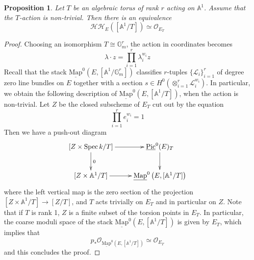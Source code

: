 \documentclass[11pt,letterpaper]{amsart}
\newtheorem{proposition}[dummy]{Proposition}
\newcommand{\bA}{\mathbb{A}}
\newcommand{\bG}{\mathbb{G}}
\newcommand{\cO}{\mathcal{O}}
\newcommand{\cL}{\mathcal{L}}
\newcommand{\cHH}{\mathcal{HH}}
\newcommand{\Mapo}[2]{\underline{\mathrm{Map}}^{0}\left (#1,#2\right )}
\newcommand{\Spec}{\mathrm{S}\mathrm{pec}\,}
\newcommand{\Pic}{\underline{\mathrm{Pic}}}
\begin{document}
\begin{proposition}\label{proposition:toricopen1}
Let $T$ be an algebraic torus of rank $r$ acting on $\bA^1$. Assume that the $T$-action is non-trivial. 
 Then there is an equivalence 
\begin{equation*}
    \cHH_E([\bA^1/T]) \simeq \cO_{E_T}
\end{equation*}
\end{proposition}
\begin{proof}
Choosing an isomorphism $T\cong \bG_m^r$, the action in coordinates becomes
$$\lambda\cdot z=\prod_{i=1}^{r}\lambda_i^{w_i}z$$
Recall that the stack $\Mapo{E}{[\bA^1/\bG_m^r]}$ classifies $r$-tuples $\{\cL_i\}_{i=1}^{r}$ of degree zero line bundles on $E$ together with a section $s\in H^0(\otimes_{i=1}^{r} \cL_i^{w_i})$. In particular, we obtain the following description of $\Mapo{E}{[\bA^1/T]}$, when the action is non-trivial. Let $Z$ be the closed subscheme of $E_T$ cut out by the equation
\begin{equation}\label{eq:e}
\prod_{i=1}^{r} e_i^{w_i}=1
\end{equation}
Then we have a push-out diagram
$$
\xymatrix{
[Z\times\Spec k/T]\ar[d]^{0}\ar[r] & \Pic^0(E)_T\ar[d]\\
[Z\times\bA^1/T]\ar[r] & \Mapo{E}{[\bA^1/T]}\\
}
$$
where the left vertical map is the zero section of the projection $[Z\times\bA^1/T]\to[Z/T]$, and $T$ acts trivially on $E_T$ and in particular on $Z$. Note that if $T$ is rank 1,  $Z$ is a finite subset of the torsion points in $E_T$.
In particular, the coarse moduli space of the stack $\Mapo{E}{[\bA^1/T]}$ is given by $E_T$, which implies that 
$$p_\ast\cO_{\Mapo{E}{[\bA^1/T]}} \simeq \cO_{E_T}$$
and this concludes the proof.
\end{proof}
\end{document}
